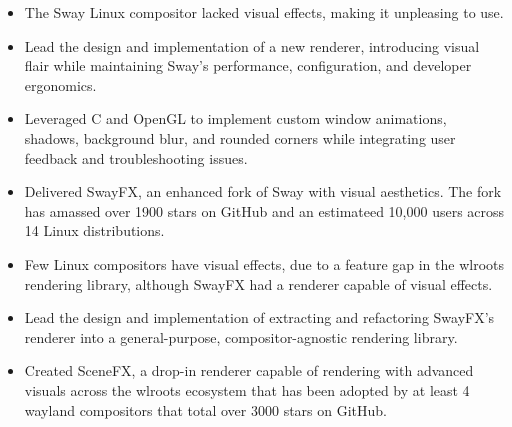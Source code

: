 


\begin{itemize}
    \item The Sway Linux compositor lacked visual effects, making it unpleasing to use.
    \item Lead the design and implementation of a new renderer, introducing visual flair while maintaining Sway’s performance, configuration, and developer ergonomics.
    \item Leveraged C and OpenGL to implement custom window animations, shadows, background blur, and rounded corners while integrating user feedback and troubleshooting issues.
    \item Delivered SwayFX, an enhanced fork of Sway with visual aesthetics. The fork has amassed over 1900 stars on GitHub and an estimateed 10,000 users across 14 Linux distributions.
\end{itemize}

\divider

\begin{itemize}
    \item Few Linux compositors have visual effects, due to a feature gap in the wlroots rendering library, although SwayFX had a renderer capable of visual effects.
    \item Lead the design and implementation of extracting and refactoring SwayFX’s renderer into a general-purpose, compositor-agnostic rendering library.
    \item Created SceneFX, a drop-in renderer capable of rendering with advanced visuals across the wlroots ecosystem that has been adopted by at least 4 wayland compositors that total over 3000 stars on GitHub.
\end{itemize}


